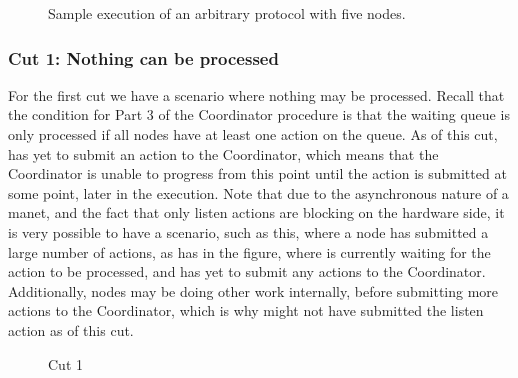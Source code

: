 \begin{figure}[H]
    \centering
    \CoordinatorFigure{%

    }
    \caption{Sample execution of an arbitrary protocol with five nodes.}\label{tikz:coordinatormsc0}
\end{figure}

\subsubsection{Cut 1: Nothing can be processed}
For the first cut we have a scenario where nothing may be processed. Recall that the condition for Part 3 of the Coordinator procedure is that the waiting queue is only processed if all nodes have at least one action on the queue. As of this cut,  has yet to submit an action to the Coordinator, which means that the Coordinator is unable to progress from this point until the  action is submitted at some point, later in the execution. Note that due to the asynchronous nature of a \gls{manet}, and the fact that only listen actions are blocking on the hardware side, it is very possible to have a scenario, such as this, where a node has submitted a large number of actions, as  has in the figure, where  is currently waiting for the  action to be processed, and  has yet to submit any actions to the Coordinator. Additionally, nodes may be doing other work internally, before submitting more actions to the Coordinator, which is why  might not have submitted the listen action  as of this cut.


\begin{figure}[H]
    \centering
    \caption{Cut 1}\label{tikz:coordinatormsc1}
\end{figure}

